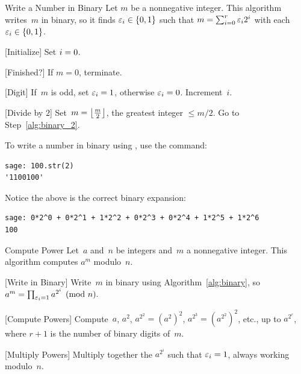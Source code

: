 \begin{algorithm}{Write a Number in Binary}\label{alg:binary}%
Let $m$ be a nonnegative integer.  This algorithm writes~$m$ in
binary, so it finds $\varepsilon_i\in\{0,1\}$ such that
$m=\sum_{i=0}^r \varepsilon_i 2^i$ with each $\varepsilon_i\in\{0,1\}$.
\begin{steps}
\item{}[Initialize] Set $i= 0$.
\item{}[Finished?]\label{alg:binary_2} If $m=0$, terminate.
\item{}[Digit]
If~$m$ is odd, set $\varepsilon_i= 1$, otherwise $\varepsilon_i= 0$.
Increment~$i$.
\item{}[Divide by $2$]
Set~$m = \left\lfloor\frac{m}{2}\right\rfloor$, the
greatest integer $\leq m/2$.  Go to Step~\ref{alg:binary_2}.
\end{steps}
\end{algorithm}

\begin{sg}
To write a number in binary using \sage, use the 
command:
\begin{verbatim}
sage: 100.str(2)
'1100100'
\end{verbatim}
Notice the above is the correct binary expansion:
\begin{verbatim}
sage: 0*2^0 + 0*2^1 + 1*2^2 + 0*2^3 + 0*2^4 + 1*2^5 + 1*2^6
100
\end{verbatim}
\end{sg}

\begin{algorithm}{Compute Power}\label{alg:power}
Let~$a$ and~$n$ be integers and~$m$ a nonnegative integer.
This algorithm computes $a^m$ modulo~$n$.
\begin{steps}
\item{}[Write in Binary] Write~$m$ in binary using Algorithm~\ref{alg:binary}, so
$
   a^m  = \prod_{\varepsilon_i = 1} a^{2^i}\pmod{n}.
$
\item{}[Compute Powers] Compute~$a$,  $a^2$, $a^{2^2} = (a^2)^2$,
$a^{2^3} = (a^{2^2})^2$, etc., up
to $a^{2^r}$, where $r+1$ is the number of binary
digits of~$m$.
\item{}[Multiply Powers] Multiply together the
$a^{2^i}$ such that $\varepsilon_i=1$,
always working modulo~$n$.
\end{steps}
\end{algorithm}

